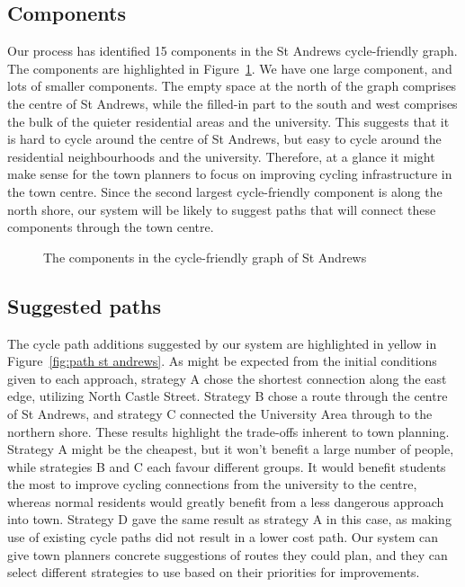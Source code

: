 \documentclass[12pt,a4paper]{report}
\begin{document}
\subsection{Components}\label{sec:components}
Our process has identified 15 components in the St Andrews cycle-friendly graph. The components are highlighted in Figure~\ref{fig:components st andrews}. We have one large component, and lots of smaller components. The empty space at the north of the graph comprises the centre of St Andrews, while the filled-in part to the south and west comprises the bulk of the quieter residential areas and the university. This suggests that it is hard to cycle around the centre of St Andrews, but easy to cycle around the residential neighbourhoods and the university. Therefore, at a glance it might make sense for the town planners to focus on improving cycling infrastructure in the town centre. Since the second largest cycle-friendly component is along the north shore, our system will be likely to suggest paths that will connect these components through the town centre.

\begin{figure}[ht]
    \centering
    
    \caption{The components in the cycle-friendly graph of St Andrews}
    \label{fig:components st andrews}
\end{figure}

\subsection{Suggested paths}\label{sec:paths}
The cycle path additions suggested by our system are highlighted in yellow in Figure~\ref{fig:path st andrews}. As might be expected from the initial conditions given to each approach, strategy A chose the shortest connection along the east edge, utilizing North Castle Street. Strategy B chose a route through the centre of St Andrews, and strategy C connected the University Area through to the northern shore. These results highlight the trade-offs inherent to town planning. Strategy A might be the cheapest, but it won't benefit a large number of people, while strategies B and C each favour different groups. It would benefit students the most to improve cycling connections from the university to the centre, whereas normal residents would greatly benefit from a less dangerous approach into town. Strategy D gave the same result as strategy A in this case, as making use of existing cycle paths did not result in a lower cost path. Our system can give town planners concrete suggestions of routes they could plan, and they can select different strategies to use based on their priorities for improvements.
\end{document}
